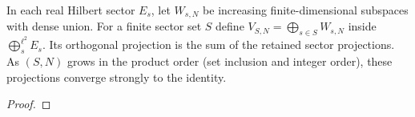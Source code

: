 \begin{supporting}
\begin{theorem}
\label{thm:hilbert-sum-galerkin}
\leanok
In each real Hilbert sector $E_s$, let $W_{s,N}$ be increasing finite-dimensional
subspaces with dense union. For a finite sector set $S$ define
$V_{S,N}=\bigoplus_{s\in S}W_{s,N}$ inside $\bigoplus_s^{\ell^2}E_s$.
Its orthogonal projection is the sum of the retained sector projections.
As $(S,N)$ grows in the product order (set inclusion and integer order), these
projections converge strongly to the identity.
\end{theorem}
\begin{proof}
\leanok
\end{proof}

\end{supporting}

